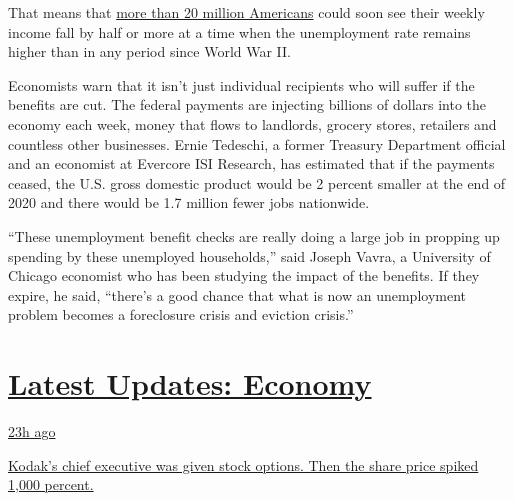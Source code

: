 That means that
\href{https://www.nytimes.com/2020/07/17/business/how-many-are-collecting-unemployment-benefits-its-hard-to-say.html}{more
than 20 million Americans} could soon see their weekly income fall by
half or more at a time when the unemployment rate remains higher than in
any period since World War II.

Economists warn that it isn't just individual recipients who will suffer
if the benefits are cut. The federal payments are injecting billions of
dollars into the economy each week, money that flows to landlords,
grocery stores, retailers and countless other businesses. Ernie
Tedeschi, a former Treasury Department official and an economist at
Evercore ISI Research, has estimated that if the payments ceased, the
U.S. gross domestic product would be 2 percent smaller at the end of
2020 and there would be 1.7 million fewer jobs nationwide.

``These unemployment benefit checks are really doing a large job in
propping up spending by these unemployed households,'' said Joseph
Vavra, a University of Chicago economist who has been studying the
impact of the benefits. If they expire, he said, ``there's a good chance
that what is now an unemployment problem becomes a foreclosure crisis
and eviction crisis.''

\hypertarget{latest-updates-economy}{%
\section{\texorpdfstring{\href{https://www.nytimes.com/live/2020/07/31/business/stock-market-today-coronavirus?action=click\&pgtype=Article\&state=default\&region=MAIN_CONTENT_1\&context=storylines_live_updates}{Latest
Updates:
Economy}}{Latest Updates: Economy}}\label{latest-updates-economy}}

\href{https://www.nytimes.com/live/2020/07/31/business/stock-market-today-coronavirus?action=click\&pgtype=Article\&state=default\&region=MAIN_CONTENT_1\&context=storylines_live_updates\#kodaks-chief-executive-was-given-stock-options-then-the-share-price-spiked-1000-percent}{23h
ago}

\href{https://www.nytimes.com/live/2020/07/31/business/stock-market-today-coronavirus?action=click\&pgtype=Article\&state=default\&region=MAIN_CONTENT_1\&context=storylines_live_updates\#kodaks-chief-executive-was-given-stock-options-then-the-share-price-spiked-1000-percent}{Kodak's
chief executive was given stock options. Then the share price spiked
1,000 percent.}

